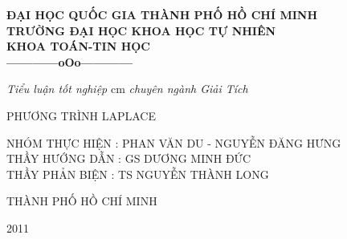 \baselineskip 20pt
\vspace{3in}
\begin{center}
{\bf ĐẠI HỌC QUỐC GIA THÀNH PHỐ HỒ CHÍ MINH\\
TRƯỜNG ĐẠI HỌC KHOA HỌC TỰ NHIÊN\\
KHOA TOÁN-TIN HỌC\\
------------oOo------------}
\end{center}

\vglue 1cm
\begin{center}
{\it Tiểu  luận  tốt  nghiệp}
 cm
{\it chuyên ngành Giải Tích}
\vspace{1in}
\end{center}

\begin{center} {\huge PHƯƠNG TRÌNH LAPLACE} \vspace{1.5in} \end{center}
{\large NHÓM THỰC HIỆN : PHAN VĂN DU - NGUYỄN ĐĂNG HƯNG} \vspace{0.2in}\\
{\large THẦY HƯỚNG DẪN : GS DƯƠNG MINH ĐỨC} \vspace{0.2in}\\
{\large THẦY PHẢN BIỆN :  TS NGUYỄN THÀNH LONG} \vspace{0.5in}\\
\begin{center} {\Large THÀNH PHỐ HỒ CHÍ MINH} \vspace{0.2in} \end{center}
\begin{center} {\Large 2011 } \end{center}
